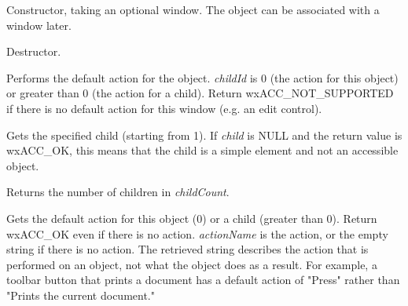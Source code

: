 
\label{wxaccessiblewxaccessible}


Constructor, taking an optional window. The object can be associated with
a window later.

\label{wxaccessibledtor}


Destructor.

\label{wxaccessibledodefaultaction}


Performs the default action for the object. {\it childId} is 0 (the action for this object)
or greater than 0 (the action for a child). Return wxACC\_NOT\_SUPPORTED if there
is no default action for this window (e.g. an edit control).

\label{wxaccessiblegetchild}


Gets the specified child (starting from 1). If {\it child} is NULL and the return value is wxACC\_OK,
this means that the child is a simple element and not an accessible object.

\label{wxaccessiblegetchildcount}


Returns the number of children in {\it childCount}.

\label{wxaccessiblegetdefaultaction}


Gets the default action for this object (0) or a child (greater than 0).
Return wxACC\_OK even if there is no action. {\it actionName} is the action, or the empty
string if there is no action. The retrieved string describes the action that is performed on an object,
not what the object does as a result. For example, a toolbar button that prints
a document has a default action of "Press" rather than "Prints the current document."

